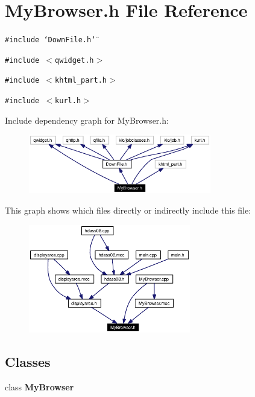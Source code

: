 \section{My\-Browser.h File Reference}
\label{MyBrowser_8h}


{\tt \#include \char`\"{}Down\-File.h\char`\"{}}\par
{\tt \#include $<$qwidget.h$>$}\par
{\tt \#include $<$khtml\_\-part.h$>$}\par
{\tt \#include $<$kurl.h$>$}\par


Include dependency graph for My\-Browser.h:\begin{figure}[H]
\begin{center}
\leavevmode
\includegraphics[width=226pt]{MyBrowser_8h__incl}
\end{center}
\end{figure}


This graph shows which files directly or indirectly include this file:\begin{figure}[H]
\begin{center}
\leavevmode
\includegraphics[width=200pt]{MyBrowser_8h__dep__incl}
\end{center}
\end{figure}
\subsection*{Classes}
\begin{CompactItemize}
\item 
class {\bf My\-Browser}
\end{CompactItemize}

